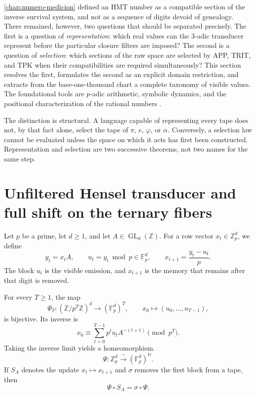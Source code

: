 \label{chap:cobertura-taxonomia-numeros}

\cref{chap:numero-medicion} defined an HMT number as a compatible section
of the inverse survival system, and not as a sequence of
digits devoid of genealogy. There remained, however, two questions that
should be separated precisely. The first is a question of
\emph{representation}: which real values can the
3-adic transducer represent before the particular closure filters are imposed? The second is
a question of \emph{selection}: which sections of the raw space are
selected by APP, TRIT, and TPK when their compatibilities are required
simultaneously? This section resolves the first, formulates the second as
an explicit domain restriction, and extracts from the base-one-thousand chart a
complete taxonomy of visible values. The foundational tools are
\(p\)-adic arithmetic, symbolic dynamics, and the positional characterization
of the rational numbers \cite{Koblitz1984,LindMarcus1995,HardyWright2008}.

The distinction is structural. A language capable of representing every tape does not, by that fact alone, select the tape of \(\pi\), \(e\), \(\varphi\), or \(\alpha\). Conversely, a selection law cannot be evaluated unless the space on which it acts has first been constructed. Representation and selection are two successive theorems, not two names for the same step.

\section{Unfiltered Hensel transducer and full shift on the ternary fibers}

Let \(p\) be a prime, let \(d\geq1\), and let
\(A\in\operatorname{GL}_d(\mathbb Z)\). For a row vector
\(x_t\in\mathbb Z_p^d\), we define
\begin{equation}
 y_t=x_tA,
 \qquad
 u_t=y_t\bmod p\in\mathbb F_p^d,
 \qquad
 x_{t+1}=\frac{y_t-u_t}{p}.
 \label{eq:transductor-hensel-general}
\end{equation}
The block \(u_t\) is the visible emission, and \(x_{t+1}\) is the memory that
remains after that digit is removed.

\begin{theorem}
\label{thm:shift-hensel-completo}
For every \(T\geq1\), the map
\[
 \Psi_T:(\mathbb Z/p^T\mathbb Z)^d
 \longrightarrow(\mathbb F_p^d)^T,
 \qquad
 x_0\longmapsto(u_0,\ldots,u_{T-1}),
\]
is bijective. Its inverse is
\begin{equation}
 x_0\equiv
 \sum_{t=0}^{T-1}p^t u_tA^{-(t+1)}
 \pmod {p^T}.
 \label{eq:inversa-hensel-finita}
\end{equation}
Taking the inverse limit yields a homeomorphism.
\[
 \Psi:\mathbb Z_p^d\xrightarrow{\ \sim\ }
 (\mathbb F_p^d)^{\mathbb N}.
\]
If \(S_A\) denotes the update \(x_t\mapsto x_{t+1}\) and
\(\sigma\) removes the first block from a tape, then
\[
 \Psi\circ S_A=\sigma\circ\Psi.
\]
\end{theorem}

